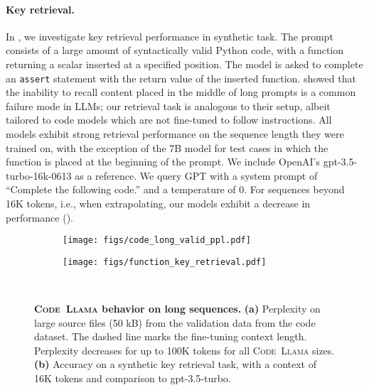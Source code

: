 \documentclass[10pt]{article}
\newcommand{\model}{\textsc{Code~Llama}\xspace}
\begin{document}
\paragraph{Key retrieval.} In , we investigate key retrieval performance in synthetic task.
The prompt consists of a large amount of syntactically valid Python code, with a function returning a scalar inserted at a specified position.
The model is asked to complete an \texttt{assert} statement with the return value of the inserted function.
\citet{liu2023lost} showed that the inability to recall content placed in the middle of long prompts is a common failure mode in LLMs; our retrieval task is analogous to their setup, albeit tailored to code models which are not fine-tuned to follow instructions. 
All models exhibit strong retrieval performance on the sequence length they were trained on, with the exception of the 7B model for test cases in which the function is placed at the beginning of the prompt.
We include OpenAI’s gpt-3.5-turbo-16k-0613 as a reference. We query GPT with a system prompt of ``Complete the following code.'' and a temperature of 0. 
For sequences beyond 16K tokens, i.e., when extrapolating, our models exhibit a decrease in performance ().

\begin{figure}[t!]
     \centering
     \begin{subfigure}[T]{0.45\textwidth}
         \centering
         \texttt{[image: figs/code\_long\_valid\_ppl.pdf]}
         \caption{}
         \label{fig:lcft-code-ppl}
     \end{subfigure}
     \hfill
     \begin{subfigure}[T]{0.45\textwidth}
         \centering
         \texttt{[image: figs/function\_key\_retrieval.pdf]}
         \caption{}
         \label{fig:lcft-key-retrieval}
     \end{subfigure} \\
    \caption{\textbf{\model behavior on long sequences.}
    \textbf{(a)} Perplexity on large source files (50 kB) from the validation data from the code dataset. The dashed line marks the fine-tuning context length. Perplexity decreases for up to 100K tokens for all \model sizes.
    \textbf{(b)} Accuracy on a synthetic key retrieval task, with a context of 16K tokens and comparison to gpt-3.5-turbo.
    }
    \label{fig:long_sequences}
\end{figure}
\end{document}
